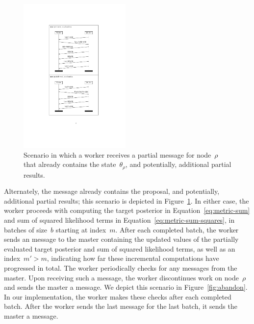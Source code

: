\documentclass[angelino.tex]{subfiles}
\begin{document}
\begin{figure}[t]
\centering
\includegraphics[width=0.49\textwidth]{figs/protocol/partial-work.pdf}
\caption{Scenario in which a worker receives a partial \HAVEWORK message
for node~$\rho$ that already contains the state~$\theta_\rho$,
and potentially, additional partial results.}
\label{fig:partial-work}
\end{figure}

Alternately, the \HAVEWORK message already contains the proposal,
and potentially, additional partial results; this scenario is depicted in Figure~\ref{fig:partial-work}.
%
In either case, the worker proceeds with computing the target posterior in 
Equation~\ref{eq:metric-sum} and sum of squared likelihood terms in 
Equation~\ref{eq:metric-sum-squares}, in batches of size~$b$ starting at index~$m$.
%	
After each completed batch, the worker sends an \UPDATE message to the
master containing the updated values of the partially evaluated
target posterior and sum of squared likelihood terms,
as well as an index~$m' > m$, indicating how far these
incremental computations have progressed in total.
%
The worker periodically checks for any \ABANDON messages from the
master.
Upon receiving such a message, the worker discontinues work on
node~$\rho$ and sends the master a \WANTWORK message.
We depict this scenario in Figure~\ref{fig:abandon}.
In our implementation, the worker makes these checks after each completed batch.
%
After the worker sends the last \UPDATE message for the last batch,
it sends the master a \WANTWORK message.
\end{document}
